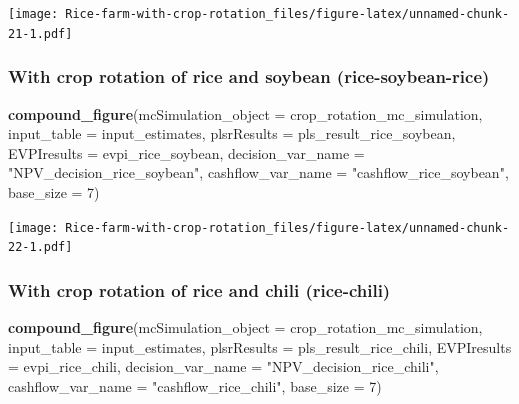 \documentclass[
]{article}
\newenvironment{Shaded}{\begin{snugshade}}{\end{snugshade}}
\newcommand{\AttributeTok}[1]{\textcolor[rgb]{0.13,0.29,0.53}{#1}}
\newcommand{\DecValTok}[1]{\textcolor[rgb]{0.00,0.00,0.81}{#1}}
\newcommand{\FunctionTok}[1]{\textcolor[rgb]{0.13,0.29,0.53}{\textbf{#1}}}
\newcommand{\NormalTok}[1]{#1}
\newcommand{\StringTok}[1]{\textcolor[rgb]{0.31,0.60,0.02}{#1}}
\begin{document}
\texttt{[image: Rice-farm-with-crop-rotation\_files/figure-latex/unnamed-chunk-21-1.pdf]}

\hypertarget{with-crop-rotation-of-rice-and-soybean-rice-soybean-rice-2}{%
\subsubsection{With crop rotation of rice and soybean
(rice-soybean-rice)}\label{with-crop-rotation-of-rice-and-soybean-rice-soybean-rice-2}}

\begin{Shaded}
\begin{Highlighting}[]
\FunctionTok{compound\_figure}\NormalTok{(}\AttributeTok{mcSimulation\_object =}\NormalTok{ crop\_rotation\_mc\_simulation, }
                \AttributeTok{input\_table =}\NormalTok{ input\_estimates, }\AttributeTok{plsrResults =}\NormalTok{ pls\_result\_rice\_soybean, }
                \AttributeTok{EVPIresults =}\NormalTok{ evpi\_rice\_soybean, }\AttributeTok{decision\_var\_name =} \StringTok{"NPV\_decision\_rice\_soybean"}\NormalTok{, }
                \AttributeTok{cashflow\_var\_name =} \StringTok{"cashflow\_rice\_soybean"}\NormalTok{, }
                \AttributeTok{base\_size =} \DecValTok{7}\NormalTok{)}
\end{Highlighting}
\end{Shaded}

\texttt{[image: Rice-farm-with-crop-rotation\_files/figure-latex/unnamed-chunk-22-1.pdf]}

\hypertarget{with-crop-rotation-of-rice-and-chili-rice-chili-2}{%
\subsubsection{With crop rotation of rice and chili
(rice-chili)}\label{with-crop-rotation-of-rice-and-chili-rice-chili-2}}

\begin{Shaded}
\begin{Highlighting}[]
\FunctionTok{compound\_figure}\NormalTok{(}\AttributeTok{mcSimulation\_object =}\NormalTok{ crop\_rotation\_mc\_simulation, }
                \AttributeTok{input\_table =}\NormalTok{ input\_estimates, }\AttributeTok{plsrResults =}\NormalTok{ pls\_result\_rice\_chili, }
                \AttributeTok{EVPIresults =}\NormalTok{ evpi\_rice\_chili, }\AttributeTok{decision\_var\_name =} \StringTok{"NPV\_decision\_rice\_chili"}\NormalTok{, }
                \AttributeTok{cashflow\_var\_name =} \StringTok{"cashflow\_rice\_chili"}\NormalTok{, }
                \AttributeTok{base\_size =} \DecValTok{7}\NormalTok{)}
\end{Highlighting}
\end{Shaded}
\end{document}
